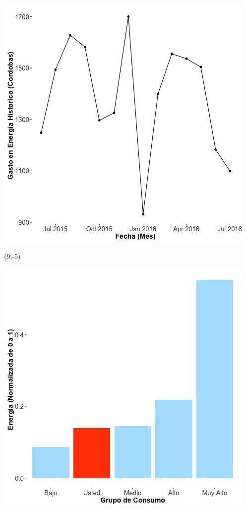 \documentclass{article}\usepackage[]{graphicx}\usepackage[]{color}
\newenvironment{knitrout}{}{} %
\begin{document}
\begin{knitrout}
\color{fgcolor}
\includegraphics[scale=0.65]{figure/A25_historico_cordobas} 
\end{knitrout}

 \begin{textblock}{1}(9,-5)
\begin{minipage}{20em}
\begingroup

\endgroup
\end{minipage}
\end{textblock}


\begin{knitrout}
\color{fgcolor}
\includegraphics[scale=0.65]{figure/A25_neighbor_plot} 
\end{knitrout}
\end{document}
